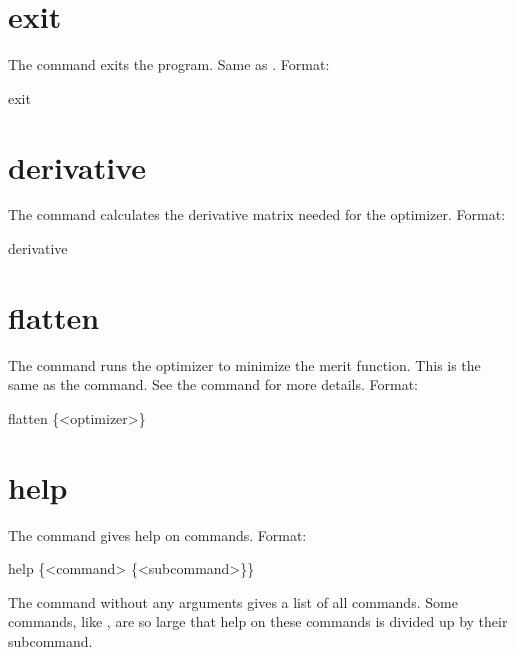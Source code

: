 \section{exit}
\label{s:exit}

The  command exits the program. Same as .  Format:
\begin{example}
  exit
\end{example}

\section{derivative}
\label{s:deriv}

The  command calculates the  derivative matrix needed
for the  optimizer.  Format:
\begin{example}
  derivative
\end{example}

\section{flatten}
\label{s:flatten}

The  command runs the optimizer to minimize the merit function. This is the
same as the  command.  See the  command for more
details.  Format:
\begin{example}
  flatten \{<optimizer>\}
\end{example}

\vskip 10pt

\section{help}
\label{s:help}

The  command gives help on \tao commands. Format:
\begin{example}
  help \{<command> \{<subcommand>\}\}
\end{example}

\vskip 10pt

The  command without any arguments gives a list of all commands.  Some commands,
like , are so large that help on these commands is divided up by their
subcommand.


